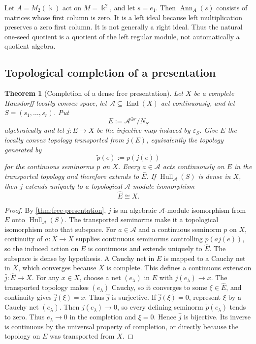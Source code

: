 \documentclass[11pt]{article}
\newtheorem{theorem}{Theorem}[section]
\theoremstyle{definition}
\theoremstyle{remark}
\theoremstyle{definition}\newtheorem{example}[theorem]{Example}
\newcommand{\bbk}{\Bbbk}
\newcommand{\A}{\mathcal A}
\newcommand{\Hull}{\operatorname{Hull}}
\newcommand{\End}{\operatorname{End}}
\newcommand{\RecordID}[1]{\label{record:#1}}
\newcommand{\Depends}[1]{}
\begin{document}
\begin{microexample}[title={Why the annihilator need not be two-sided}]
Let \(A=M_2(\bbk)\) act on \(M=\bbk^2\), and let \(s=e_1\).  Then \(\operatorname{Ann}_A(s)\) consists of matrices whose first column is zero.  It is a left ideal because left multiplication preserves a zero first column.  It is not generally a right ideal.  Thus the natural one-seed quotient is a quotient of the left regular module, not automatically a quotient algebra.
\end{microexample}


\subsection{Topological completion of a presentation}
\begin{theorem}[Completion of a dense free presentation]
\label{thm:completed-presentation}
Let $X$ be a complete Hausdorff locally convex space, let $\A\subseteq\End(X)$ act continuously, and let $S=(s_1,\ldots,s_r)$.  Put
\[
E:=\A^{\oplus r}/N_S
\]
algebraically and let $j:E\to X$ be the injective map induced by $\varepsilon_S$.  Give $E$ the locally convex topology transported from $j(E)$, equivalently the topology generated by
\[
\widetilde p(e):=p(j(e))
\]
for the continuous seminorms $p$ on $X$.  Every $a\in\A$ acts continuously on $E$ in the transported topology and therefore extends to $\widehat E$.  If $\Hull_{\A}(S)$ is dense in $X$, then $j$ extends uniquely to a topological $\A$-module isomorphism
\[
\boxed{\widehat E\cong X.}
\]
\end{theorem}
\RecordID{PSC-I-T-COMPLETED-PRESENTATION}
\Depends{PSC-I-T-FREE-PRESENTATION and uniqueness of Hausdorff completion.}

\begin{proof}
By \cref{thm:free-presentation}, $j$ is an algebraic $\A$-module isomorphism from $E$ onto $\Hull_{\A}(S)$.  The transported seminorms make it a topological isomorphism onto that subspace.  For $a\in\A$ and a continuous seminorm $p$ on $X$, continuity of $a:X\to X$ supplies continuous seminorms controlling $p(aj(e))$, so the induced action on $E$ is continuous and extends uniquely to $\widehat E$.  The subspace is dense by hypothesis.  A Cauchy net in $E$ is mapped to a Cauchy net in $X$, which converges because $X$ is complete.  This defines a continuous extension $\widehat j:\widehat E\to X$.  For any $x\in X$, choose a net $(e_\lambda)$ in $E$ with $j(e_\lambda)\to x$.  The transported topology makes $(e_\lambda)$ Cauchy, so it converges to some $\xi\in\widehat E$, and continuity gives $\widehat j(\xi)=x$.  Thus $\widehat j$ is surjective.  If $\widehat j(\xi)=0$, represent $\xi$ by a Cauchy net $(e_\lambda)$.  Then $j(e_\lambda)\to0$, so every defining seminorm $\widetilde p(e_\lambda)$ tends to zero.  Thus $e_\lambda\to0$ in the completion and $\xi=0$.  Hence $\widehat j$ is bijective.  Its inverse is continuous by the universal property of completion, or directly because the topology on $E$ was transported from $X$.
\end{proof}
\end{document}
